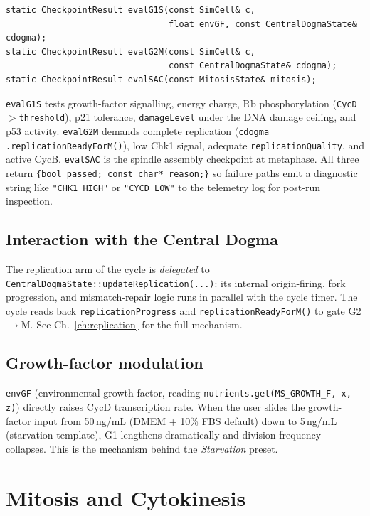 \documentclass[11pt,letterpaper,twoside,openany]{book}
\newcommand{\code}[1]{\texttt{#1}}
\begin{document}
\begin{lstlisting}
static CheckpointResult evalG1S(const SimCell& c,
                                float envGF, const CentralDogmaState& cdogma);
static CheckpointResult evalG2M(const SimCell& c,
                                const CentralDogmaState& cdogma);
static CheckpointResult evalSAC(const MitosisState& mitosis);
\end{lstlisting}

\code{evalG1S} tests growth-factor signalling, energy charge, Rb
phosphorylation (\code{CycD$>$threshold}), p21 tolerance,
\code{damageLevel} under the DNA damage ceiling, and p53 activity.
\code{evalG2M} demands complete replication (\code{cdogma
.replicationReadyForM()}), low Chk1 signal, adequate
\code{replicationQuality}, and active CycB. \code{evalSAC} is the
spindle assembly checkpoint at metaphase. All three return
\code{\{bool passed; const char* reason;\}} so failure paths emit a
diagnostic string like \texttt{"CHK1\_HIGH"} or \texttt{"CYCD\_LOW"}
to the telemetry log for post-run inspection.

\section{Interaction with the Central Dogma}

The replication arm of the cycle is \emph{delegated} to
\code{CentralDogmaState::updateReplication(...)}: its internal
origin-firing, fork progression, and mismatch-repair logic runs in
parallel with the cycle timer. The cycle reads back
\code{replicationProgress} and \code{replicationReadyForM()} to gate
G2\(\to\)M. See Ch.~\ref{ch:replication} for the full mechanism.

\section{Growth-factor modulation}

\code{envGF} (environmental growth factor, reading
\code{nutrients.get(MS\_GROWTH\_F, x, z)}) directly raises CycD
transcription rate. When the user slides the growth-factor input
from 50\,ng/mL (DMEM + 10\% FBS default) down to 5\,ng/mL
(starvation template), G1 lengthens dramatically and division
frequency collapses. This is the mechanism behind the
\emph{Starvation} preset.

\chapter{Mitosis and Cytokinesis}
\label{ch:mitosis}
\end{document}
